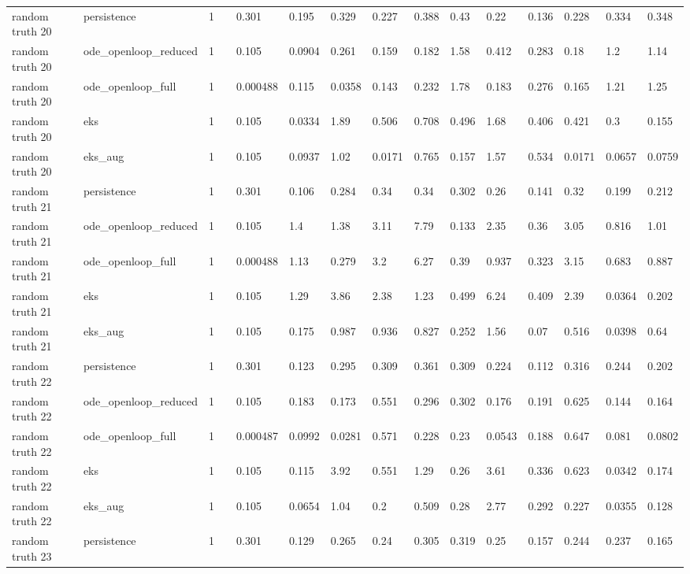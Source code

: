 \begin{table}[t]
\begin{tabular}{lllllllllllllll}
random truth 20 & persistence & 1 &  & 0.301 & 0.195 & 0.329 & 0.227 & 0.388 & 0.43 & 0.22 & 0.136 & 0.228 & 0.334 & 0.348 \\
random truth 20 & ode\_openloop\_reduced & 1 &  & 0.105 & 0.0904 & 0.261 & 0.159 & 0.182 & 1.58 & 0.412 & 0.283 & 0.18 & 1.2 & 1.14 \\
random truth 20 & ode\_openloop\_full & 1 &  & 0.000488 & 0.115 & 0.0358 & 0.143 & 0.232 & 1.78 & 0.183 & 0.276 & 0.165 & 1.21 & 1.25 \\
random truth 20 & eks & 1 &  & 0.105 & 0.0334 & 1.89 & 0.506 & 0.708 & 0.496 & 1.68 & 0.406 & 0.421 & 0.3 & 0.155 \\
random truth 20 & eks\_aug & 1 &  & 0.105 & 0.0937 & 1.02 & 0.0171 & 0.765 & 0.157 & 1.57 & 0.534 & 0.0171 & 0.0657 & 0.0759 \\
random truth 21 & persistence & 1 &  & 0.301 & 0.106 & 0.284 & 0.34 & 0.34 & 0.302 & 0.26 & 0.141 & 0.32 & 0.199 & 0.212 \\
random truth 21 & ode\_openloop\_reduced & 1 &  & 0.105 & 1.4 & 1.38 & 3.11 & 7.79 & 0.133 & 2.35 & 0.36 & 3.05 & 0.816 & 1.01 \\
random truth 21 & ode\_openloop\_full & 1 &  & 0.000488 & 1.13 & 0.279 & 3.2 & 6.27 & 0.39 & 0.937 & 0.323 & 3.15 & 0.683 & 0.887 \\
random truth 21 & eks & 1 &  & 0.105 & 1.29 & 3.86 & 2.38 & 1.23 & 0.499 & 6.24 & 0.409 & 2.39 & 0.0364 & 0.202 \\
random truth 21 & eks\_aug & 1 &  & 0.105 & 0.175 & 0.987 & 0.936 & 0.827 & 0.252 & 1.56 & 0.07 & 0.516 & 0.0398 & 0.64 \\
random truth 22 & persistence & 1 &  & 0.301 & 0.123 & 0.295 & 0.309 & 0.361 & 0.309 & 0.224 & 0.112 & 0.316 & 0.244 & 0.202 \\
random truth 22 & ode\_openloop\_reduced & 1 &  & 0.105 & 0.183 & 0.173 & 0.551 & 0.296 & 0.302 & 0.176 & 0.191 & 0.625 & 0.144 & 0.164 \\
random truth 22 & ode\_openloop\_full & 1 &  & 0.000487 & 0.0992 & 0.0281 & 0.571 & 0.228 & 0.23 & 0.0543 & 0.188 & 0.647 & 0.081 & 0.0802 \\
random truth 22 & eks & 1 &  & 0.105 & 0.115 & 3.92 & 0.551 & 1.29 & 0.26 & 3.61 & 0.336 & 0.623 & 0.0342 & 0.174 \\
random truth 22 & eks\_aug & 1 &  & 0.105 & 0.0654 & 1.04 & 0.2 & 0.509 & 0.28 & 2.77 & 0.292 & 0.227 & 0.0355 & 0.128 \\
random truth 23 & persistence & 1 &  & 0.301 & 0.129 & 0.265 & 0.24 & 0.305 & 0.319 & 0.25 & 0.157 & 0.244 & 0.237 & 0.165 \\

\end{tabular}
\end{table}
